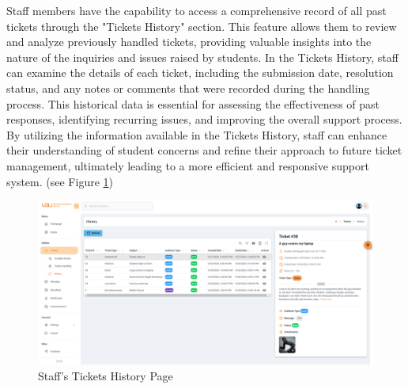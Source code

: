 	Staff members have the capability to access a comprehensive record of all past tickets through the "Tickets History" section. This feature allows them to review and analyze previously handled tickets, providing valuable insights into the nature of the inquiries and issues raised by students. In the Tickets History, staff can examine the details of each ticket, including the submission date, resolution status, and any notes or comments that were recorded during the handling process. This historical data is essential for assessing the effectiveness of past responses, identifying recurring issues, and improving the overall support process. By utilizing the information available in the Tickets History, staff can enhance their understanding of student concerns and refine their approach to future ticket management, ultimately leading to a more efficient and responsive support system. (see Figure \ref{fig:gui-st-ticket-history})
	\begin{figure}[H]
		\centering
		\includegraphics[width=1\linewidth]{graphics/gui/staff/ticket-history}
		\caption{Staff's Tickets History Page}
		\label{fig:gui-st-ticket-history}
	\end{figure}
	
	
